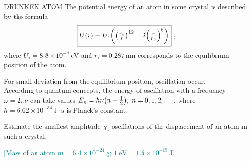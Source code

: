 \begin{qotdphybox}{DRUNKEN ATOM}
The potential energy of an atom in some crystal is described by the formula
$$\fbox{$U (r)  = U_\circ \qty(\qty(\frac{r_\circ}{r})^{12} - 2 \qty(\frac{r}{r_\circ})^6)$}\ ,$$
where $U_\circ = 8.8\times 10^{-4} ~ \mathrm{eV}$ and $r_\circ = 0.287 ~ \mathrm{nm}$ corresponds to the equilibrium position of the atom. 

For small deviation from the equilibrium position, oscillation occur.\\
According to quantum concepts, the energy of oscillation with a frequency $\omega = 2\pi \nu$ can take values $E_n = h \nu \qty(n + \frac{1}{2}),~n = 0,1,2,\dots$, where $h = 6.62\times 10^{-34} ~ \mathrm{J\cdot s}$ is Planck's constant.
\begin{qotdques}
 Estimate the smallest amplitude $\chi_\circ$ oscillations of the displacement of an atom in such a crystal.
\end{qotdques}
\textcolor{teal}{[Mass of an atom $m = 6.4 \times 10^{-24}~ \mathrm{g}$; $1 ~ \mathrm{eV} = 1.6 \times 10^{-19} ~ \mathrm{J}$]}\\
\end{qotdphybox}